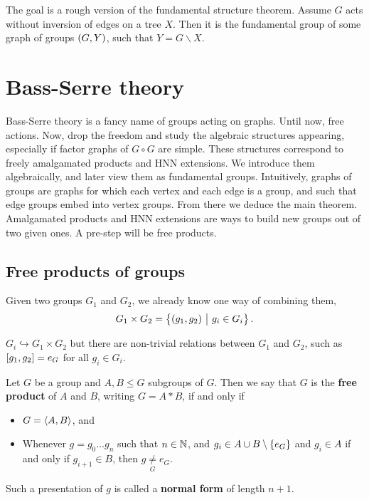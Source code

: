 The goal is a rough version of the fundamental structure theorem. Assume $ G $ acts without inversion of edges on a tree $ X $. Then it is the fundamental group of some graph of groups $ \br{G, Y} $, such that $ Y = G \backslash X $.

\pagebreak

\section{Bass-Serre theory}

Bass-Serre theory is a fancy name of groups acting on graphs. Until now, free actions. Now, drop the freedom and study the algebraic structures appearing, especially if factor graphs of $ G \circ G $ are simple. These structures correspond to freely amalgamated products and HNN extensions. We introduce them algebraically, and later view them as fundamental groups. Intuitively, graphs of groups are graphs for which each vertex and each edge is a group, and such that edge groups embed into vertex groups. From there we deduce the main theorem. Amalgamated products and HNN extensions are ways to build new groups out of two given ones. A pre-step will be free products.

\subsection{Free products of groups}

Given two groups $ G_1 $ and $ G_2 $, we already know one way of combining them,
$$ G_1 \times G_2 = \cbr{\br{g_1, g_2} \st g_i \in G_i}. $$

\begin{note*}
$ G_i \hookrightarrow G_1 \times G_2 $ but there are non-trivial relations between $ G_1 $ and $ G_2 $, such as $ \sbr{g_1, g_2} = e_G $ for all $ g_i \in G_i $.
\end{note*}

\begin{definition}
Let $ G $ be a group and $ A, B \le G $ subgroups of $ G $. Then we say that $ G $ is the \textbf{free product} of $ A $ and $ B $, writing $ G = A * B $, if and only if
\begin{itemize}
\item $ G = \left\langle A, B \right\rangle $, and
\item Whenever $ g = g_0 \dots g_n $ such that $ n \in \mathbb{N} $, and $ g_i \in A \cup B \setminus \cbr{e_G} $ and $ g_i \in A $ if and only if $ g_{i + 1} \in B $, then $ g \underset{G}{\ne} e_G $.
\end{itemize}
Such a presentation of $ g $ is called a \textbf{normal form} of length $ n + 1 $.
\end{definition}

